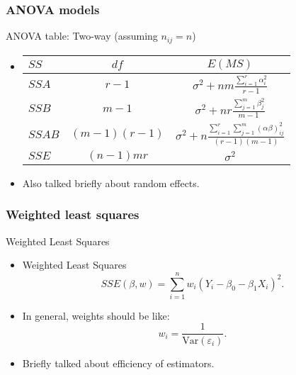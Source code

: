 \documentclass[handout]{beamer}
\begin{document}

   \begin{frame} \frametitle{ANOVA models}

   \begin{block}
   {ANOVA table: Two-way (assuming $n_{ij}=n$)}
   \begin{itemize}
   \item {\small
   \begin{tabular}{lcc}
   $SS$    & $df$ &  $E(MS)$ \\ \hline
   $SSA$ &   $r-1$     & $\sigma^2 + nm\frac{\sum_{i=1}^r \alpha_i^2}{r-1}$ \\
   $SSB$ &   $m-1$     & $\sigma^2 + nr\frac{\sum_{j=1}^m \beta_j^2}{m-1}$ \\
   $SSAB$ &   $(m-1)(r-1)$     & $\sigma^2 + n\frac{\sum_{i=1}^r\sum_{j=1}^m (\alpha\beta)_{ij}^2}{(r-1)(m-1)}$ \\
   $SSE$ & $(n-1)mr$ & $\sigma^2$ \\
   \end{tabular}}
   \item Also talked briefly about random effects.

   \end{itemize}
   \end{block}
   \end{frame}


   \begin{frame} \frametitle{Weighted least squares}

   \begin{block}
   {Weighted Least Squares}

   \begin{itemize}

   \item Weighted Least Squares
   $$
   SSE(\beta, w) = \sum_{i=1}^n w_i \left(Y_i - \beta_0 - \beta_1 X_i\right)^2.
   $$

   \item In general, weights should be
     like:
   $$
   w_i = \frac{1}{\text{Var}(\varepsilon_i)}.$$
   \item Briefly talked about efficiency of estimators.
   \end{itemize}
   \end{block}
   \end{frame}

\end{document}
